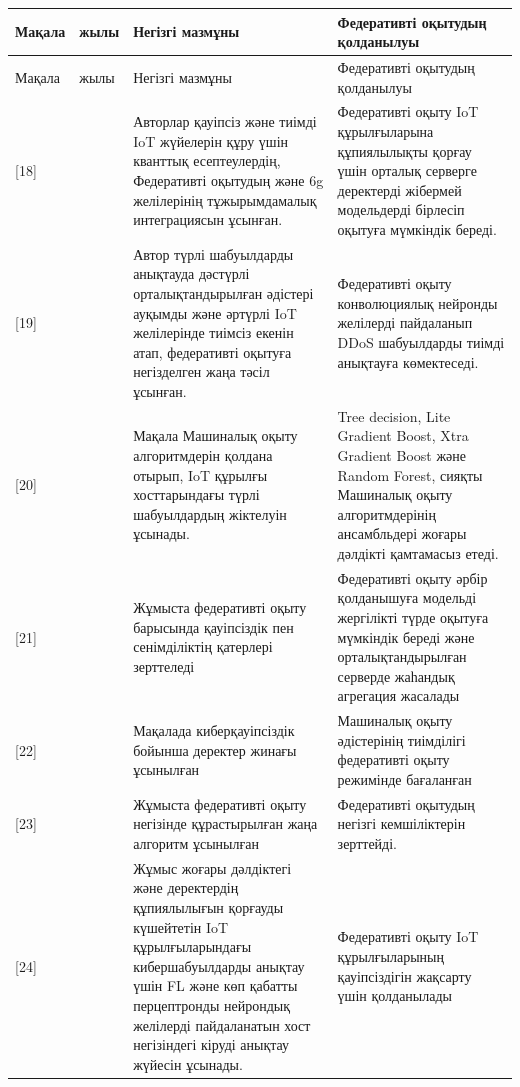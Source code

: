 \begin{longtable}[]{|@{}
  >{\raggedright\arraybackslash}p{}|
  >{\raggedright\arraybackslash}p{}|
  >{\raggedright\arraybackslash}p{}|
  >{\raggedright\arraybackslash}p{}@{}|}
\hline
\toprule\noalign{}
Мақала & жылы & Негізгі мазмұны & Федеративті оқытудың қолданылуы \\
\hline
\endfirsthead
\hline
\toprule\noalign{}
Мақала & жылы & Негізгі мазмұны & Федеративті оқытудың қолданылуы \\
\hline
\endhead
\hline
\bottomrule\noalign{}
\endlastfoot
{[}18{]} & 2024 & Авторлар қауіпсіз және тиімді IoT жүйелерін құру үшін кванттық есептеулердің, Федеративті оқытудың және 6g желілерінің тұжырымдамалық интеграциясын ұсынған. & Федеративті оқыту IoT құрылғыларына құпиялылықты қорғау үшін орталық серверге деректерді жібермей модельдерді бірлесіп оқытуға мүмкіндік береді. \\
\hline
{[}19{]} & 2024 & Автор түрлі шабуылдарды анықтауда дәстүрлі орталықтандырылған әдістері ауқымды және әртүрлі IoT желілерінде тиімсіз екенін атап, федеративті оқытуға негізделген жаңа тәсіл ұсынған. & Федеративті оқыту конволюциялық нейронды желілерді пайдаланып DDoS шабуылдарды тиімді анықтауға көмектеседі. \\
\hline
{[}20{]} & 2024 & Мақала Машиналық оқыту алгоритмдерін қолдана отырып, IoT құрылғы хосттарындағы түрлі шабуылдардың жіктелуін ұсынады. & Tree decision, Lite Gradient Boost, Xtra Gradient Boost және Random Forest, сияқты Машиналық оқыту алгоритмдерінің ансамбльдері жоғары дәлдікті қамтамасыз етеді. \\
\hline
{[}21{]} & 2020 & Жұмыста федеративті оқыту барысында қауіпсіздік пен сенімділіктің қатерлері зерттеледі & Федеративті оқыту әрбір қолданышуға модельді жергілікті түрде оқытуға мүмкіндік береді және орталықтандырылған серверде жаһандық агрегация жасалады \\
\hline
{[}22{]} & 2022 & Мақалада киберқауіпсіздік бойынша деректер жинағы ұсынылған & Машиналық оқыту әдістерінің тиімділігі федеративті оқыту режимінде бағаланған \\
\hline
{[}23{]} & 2022 & Жұмыста федеративті оқыту негізінде құрастырылған жаңа алгоритм ұсынылған & Федеративті оқытудың негізгі кемшіліктерін зерттейді. \\
\hline
{[}24{]} & 2023 & Жұмыс жоғары дәлдіктегі және деректердің құпиялылығын қорғауды күшейтетін IoT құрылғыларындағы кибершабуылдарды анықтау үшін FL және көп қабатты перцептронды нейрондық желілерді пайдаланатын хост негізіндегі кіруді анықтау жүйесін ұсынады. & Федеративті оқыту IoT құрылғыларының қауіпсіздігін жақсарту үшін қолданылады \\

\end{longtable}
